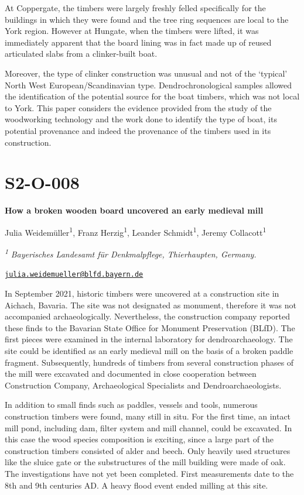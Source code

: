 \documentclass[
]{book}
\begin{document}
At Coppergate, the timbers were largely freshly felled specifically for the buildings in which they were found and the tree ring sequences are local to the York region. However at Hungate, when the timbers were lifted, it was immediately apparent that the board lining was in fact made up of reused articulated slabs from a clinker-built boat.

Moreover, the type of clinker construction was unusual and not of the `typical' North West European/Scandinavian type. Dendrochronological samples allowed the identification of the potential source for the boat timbers, which was not local to York. This paper considers the evidence provided from the study of the woodworking technology and the work done to identify the type of boat, its potential provenance and indeed the provenance of the timbers used in its construction.

\hypertarget{s2-o-008}{%
\section*{S2-O-008}\label{s2-o-008}}

\textbf{How a broken wooden board uncovered an early medieval mill}

Julia Weidemüller\textsuperscript{1}, Franz Herzig\textsuperscript{1}, Leander Schmidt\textsuperscript{1}, Jeremy Collacott\textsuperscript{1}

\textsuperscript{\emph{1}} \emph{Bayerisches Landesamt für Denkmalpflege, Thierhaupten, Germany.}

\href{mailto:julia.weidemueller@blfd.bayern.de}{\nolinkurl{julia.weidemueller@blfd.bayern.de}}

In September 2021, historic timbers were uncovered at a construction site in Aichach, Bavaria. The site was not designated as monument, therefore it was not accompanied archaeologically. Nevertheless, the construction company reported these finds to the Bavarian State Office for Monument Preservation (BLfD). The first pieces were examined in the internal laboratory for dendroarchaeology. The site could be identified as an early medieval mill on the basis of a broken paddle fragment. Subsequently, hundreds of timbers from several construction phases of the mill were excavated and documented in close cooperation between Construction Company, Archaeological Specialists and Dendroarchaeologists.

In addition to small finds such as paddles, vessels and tools, numerous construction timbers were found, many still in situ. For the first time, an intact mill pond, including dam, filter system and mill channel, could be excavated. In this case the wood species composition is exciting, since a large part of the construction timbers consisted of alder and beech. Only heavily used structures like the sluice gate or the substructures of the mill building were made of oak. The investigations have not yet been completed. First measurements date to the 8th and 9th centuries AD. A heavy flood event ended milling at this site.
\end{document}
